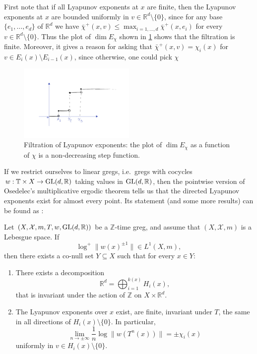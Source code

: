 \documentclass{report}
\begin{document}
\begin{remark}
    First note that if all Lyapunov exponents at $x$ are finite, then the Lyapunov exponents at $x$ are bounded uniformly in $v \in \mathbb R^d \setminus \{0\}$, since for any base $\{e_1, \ldots, e_d\}$ of $\mathbb R^d$ we have $\bar \chi^+(x, v) \leq \max_{i=1,\ldots,d} \bar \chi^+(x, e_i)$ for every $v \in \mathbb R^d \setminus \{0\}$.
    Thus the plot of $\dim E_\chi$ shown in \cref{fig:lyapunov_filtration} shows that the filtration is finite.
    Moreover, it gives a reason for asking that $\bar \chi^+(x,v) = \chi_i(x)$ for $v \in E_i(x) \setminus E_{i-1}(x)$, since otherwise, one could pick $\chi$ 
\end{remark}
\begin{figure}[h]
        \centering
        \includegraphics[width=0.5\textwidth]{figures/exponents.png}
        \caption{Filtration of Lyapunov exponents: the plot of $\dim E_\chi$ as a function of $\chi$ is a non-decreasing step function.}
        \label{fig:lyapunov_filtration}
    \end{figure}
If we restrict ourselves to linear gregs, i.e.\ gregs with cocycles $w: \mathbb T \times X \to \operatorname{{\mathrm{GL}}}(d, \mathbb R)$ taking values in $\operatorname{{\mathrm{GL}}}(d,\mathbb R)$,
then the pointwise version of Osedelec's multiplicative ergodic theorem tells us that the directed Lyapunov exponents exist for almost every point.
Its statement (and some more results) can be found as \cite[Theorem S.2.9]{katok1995introduction}:
\begin{theorem}\label{thm:osedelec}
    Let $(X, \mathcal X, m, T, w, \operatorname{{\mathrm{GL}}}(d,\mathbb R))$ be a $\mathbb Z$-time greg, and assume that $(X, \mathcal X, m)$ is a Lebesgue space.
    If 
    \[
    \log^+ \|w(x)^{\pm 1}\| \in L^1(X, m),
    \]
    then there exists a co-null set $Y \subseteq X$ such that for every $x \in Y$:
    \begin{enumerate}[label=(\roman*)]
        \item There exists a decomposition 
        \[
        \mathbb R^d = \bigoplus_{i=1}^{k(x)} H_i(x),
        \]
        that is invariant under the action of $\mathbb Z$ on $X \times \mathbb R^d$.
        \item The Lyapunov exponents over $x$ exist, are finite, invariant under $T$, the same in all directions of $H_i(x) \setminus \{0\}$.
        In particular, 
        \[
        \lim_{n \to \pm \infty} \frac{1}{n} \log \|w(T^n(x))\| = \pm \chi_i(x)
        \]
        uniformly in $v \in H_i(x) \setminus \{0\}$.
    \end{enumerate}
\end{theorem}
\end{document}
